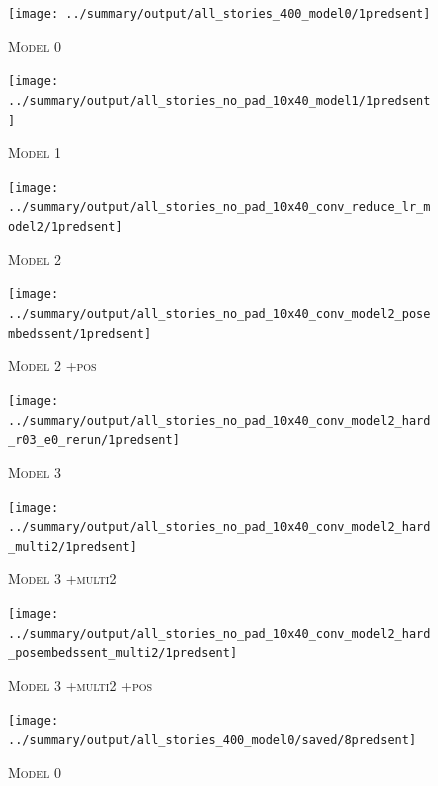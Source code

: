 \documentclass[12pt]{report}
\begin{document}
\begin{appendices}
\begin{figure}[p]
\centering
\texttt{[image: ../summary/output/all\_stories\_400\_model0/1predsent]}
\caption[\textsc{Model 0} Attention]{\textsc{Model 0}}
\end{figure}

\begin{figure}[p]
\centering
\texttt{[image: ../summary/output/all\_stories\_no\_pad\_10x40\_model1/1predsent]}
\caption[\textsc{Model 1} Attention]{\textsc{Model 1}}
\end{figure}

\begin{figure}[p]
\centering
\texttt{[image: ../summary/output/all\_stories\_no\_pad\_10x40\_conv\_reduce\_lr\_model2/1predsent]}
\caption[\textsc{Model 2} Attention]{\textsc{Model 2}}
\end{figure}

\begin{figure}[p]
\centering
\texttt{[image: ../summary/output/all\_stories\_no\_pad\_10x40\_conv\_model2\_posembedssent/1predsent]}
\caption[\textsc{Model 2 +pos} Attention]{\textsc{Model 2 +pos}}
\end{figure}

\begin{figure}[p]
\centering
\texttt{[image: ../summary/output/all\_stories\_no\_pad\_10x40\_conv\_model2\_hard\_r03\_e0\_rerun/1predsent]}
\caption[\textsc{Model 3} Attention]{\textsc{Model 3}}
\end{figure}

\begin{figure}[p]
\centering
\texttt{[image: ../summary/output/all\_stories\_no\_pad\_10x40\_conv\_model2\_hard\_multi2/1predsent]}
\caption[\textsc{Model 3 +multi2} Attention]{\textsc{Model 3 +multi2}}
\end{figure}

\begin{figure}[p]
\centering
\texttt{[image: ../summary/output/all\_stories\_no\_pad\_10x40\_conv\_model2\_hard\_posembedssent\_multi2/1predsent]}
\caption[\textsc{Model 3 +multi2 +pos} Attention]{\textsc{Model 3 +multi2 +pos}}
\end{figure}




\begin{figure}[p]
\centering
\texttt{[image: ../summary/output/all\_stories\_400\_model0/saved/8predsent]}
\caption[\textsc{Model 0} Attention]{\textsc{Model 0}}
\end{figure}


\end{appendices}
\end{document}
